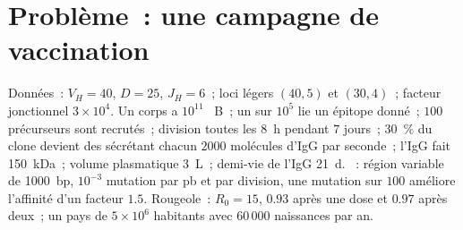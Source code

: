 \section{Problème~: une campagne de vaccination}

\begin{problem}
\label{pb:b3:adaptive-immunity:1}
Données~: $V_{H} = 40$, $D = 25$, $J_{H} = 6$~; loci légers $(40, 5)$ et
$(30, 4)$~; facteur jonctionnel $3\times 10^{4}$. Un corps a $10^{11}$
~B~; un sur $10^{5}$ lie un épitope donné~; $100$ précurseurs
sont recrutés~; division toutes les \qty{8}{h} pendant $7$ jours~;
\qty{30}{\%} du clone devient des  sécrétant chacun $2000$
molécules d'IgG par seconde~; l'IgG fait \qty{150}{kDa}~; volume
plasmatique \qty{3}{L}~; demi-vie de l'IgG \qty{21}{d}. ~: région variable de \qty{1000}{bp}, $10^{-3}$ mutation par
pb et par division, une mutation sur $100$ améliore l'affinité d'un
facteur $1.5$. Rougeole~: $R_{0} = 15$,  $0.93$
après une dose et $0.97$ après deux~; un pays de $5\times 10^{6}$
habitants avec $60\,000$ naissances par an.


\end{problem}
